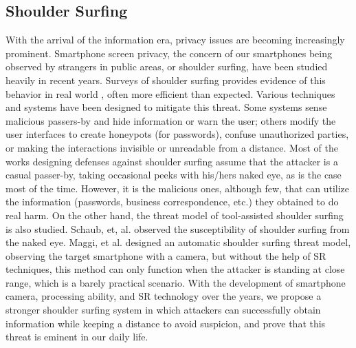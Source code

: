 \subsection{Shoulder Surfing}
With the arrival of the information era, privacy issues are becoming increasingly prominent. Smartphone screen privacy, the concern of our smartphones being observed by strangers in public areas, or shoulder surfing, have been studied heavily in recent years. Surveys of shoulder surfing provides evidence of this behavior in real world \cite{eiband2017understanding} \cite{goucher2011look}, often more efficient than expected\cite{kwon2013covert}. Various techniques and systems have been designed to mitigate this threat. Some systems sense malicious passers-by and hide information \cite{brudy2014anyone} or warn the user\cite{saad2018communicating}; others modify the user interfaces to create honeypots (for passwords)\cite{chakraborty2014tag}, confuse unauthorized parties\cite{wiedenbeck2006design}, or making the interactions invisible\cite{kumar2007reducing} or unreadable from a distance\cite{Chun2019Keep}. Most of the works designing defenses against shoulder surfing assume that the attacker is a casual passer-by, taking occasional peeks with his/hers naked eye, as is the case most of the time\cite{eiband2017understanding}. However, it is the malicious ones, although few, that can utilize the information (passwords, business correspondence, etc.) they obtained to do real harm. On the other hand, the threat model of tool-assisted shoulder surfing is also studied. Schaub, et, al. observed the susceptibility of shoulder surfing from the naked eye\cite{schaub2012password}. Maggi, et al. designed an automatic shoulder surfing threat model, observing the target smartphone with a camera\cite{maggi2011poster}, but without the help of SR techniques, this method can only function when the attacker is standing at close range, which is a barely practical scenario. With the development of smartphone camera, processing ability, and SR technology over the years, we propose a stronger shoulder surfing system in which attackers can successfully obtain information while keeping a distance to avoid suspicion, and prove that this threat is eminent in our daily life.

